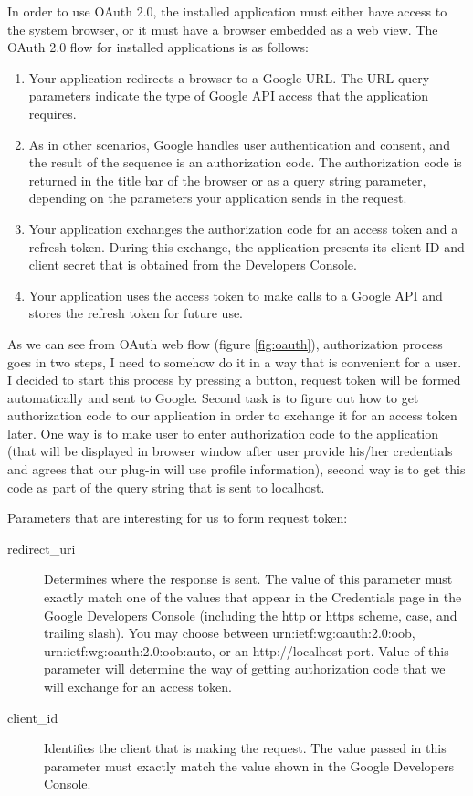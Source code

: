 \documentclass[thesis=B,english]{FITthesis}[2012/10/20]
\begin{document}
In order to use OAuth 2.0, the installed application must either have access to the system browser, or it must have a browser embedded as a web view. The OAuth 2.0 flow for installed applications is as follows:
	\begin{enumerate}
		\item Your application redirects a browser to a Google URL. The URL query parameters indicate the type of Google API access that the application requires.
		\item As in other scenarios, Google handles user authentication and consent, and the result of the sequence is an authorization code. The authorization code is returned in the title bar of the browser or as a query string parameter, depending on the parameters your application sends in the request.
		\item Your application exchanges the authorization code for an access token and a refresh token. During this exchange, the application presents its client ID and client secret that is obtained from the Developers Console.
		\item Your application uses the access token to make calls to a Google API and stores the refresh token for future use.\cite{oauthdesc}
	\end{enumerate}
As we can see from OAuth web flow (figure \ref{fig:oauth}), authorization process goes in two steps, I need to somehow do it in a way that is convenient for a user. I decided to start this process by pressing a button, request token will be formed automatically and sent to Google. Second task is to figure out how to get authorization code to our application in order to exchange it for an access token later. One way is to make user to enter authorization code to the application (that will be displayed in browser window after user provide his/her credentials and agrees that our plug-in will use profile information), second way is to get this code as part of the query string that is sent to localhost.\cite{oauthdesc}

Parameters that are interesting for us to form request token:
	\begin{description}
		\item[redirect\_uri] 
Determines where the response is sent. The value of this parameter must exactly match one of the values that appear in the Credentials page in the Google Developers Console (including the http or https scheme, case, and trailing slash). You may choose between urn:ietf:wg:oauth:2.0:oob, urn:ietf:wg:oauth:2.0:oob:auto, or an http://localhost port. Value of this parameter will determine the way of getting authorization code that we will exchange for an access token.
		\item[client\_id] 
Identifies the client that is making the request. The value passed in this parameter must exactly match the value shown in the Google Developers Console.
	\end{description}
\end{document}
